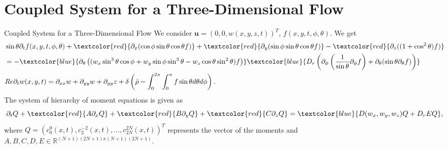 \section{Coupled System for a Three-Dimensional Flow}
\begin{frame}{Coupled System for a Three-Dimensional Flow}
	\scriptsize
	We consider $\boldsymbol{u} = \left( 0, 0, w(x,y,z,t)\right)^T$, $f(x,y,t,\phi,\theta)$. We get
	\begin{equation}
		\begin{aligned}
			&\sin\theta \partial_{t}f(x,y,t,\phi, \theta)+ \textcolor{red}{\partial_x(\cos\phi \sin\theta \cos\theta f)} + \textcolor{red}{\partial_y(\sin \phi \sin \theta \cos \theta f)} - \textcolor{red}{\partial_z((1+ \cos^2 \theta)f)} \\
			&= -  \textcolor{blue}{\partial_\theta\left(( w_x \sin^3 \theta \cos \phi + w_y\sin \phi \sin^3 \theta - w_z \cos \theta \sin^2 \theta) f\right)} \textcolor{blue}{D_{r}\left( \partial_\phi \left(\frac{1}{\sin \theta} \partial_\phi f \right)+ \partial_\theta (\sin \theta \partial_\theta f)\right)} \\
			&Re\partial_{t}w(x,y,t) = \partial_{xx}w + \partial_{yy}w + \partial_{yy}z + \delta\left(\bar{\rho}-\int_{0}^{2\pi} \int_{0}^{\pi} f \sin \theta d\theta d\phi \right).
		\end{aligned}
	\end{equation}
	\pause
	The system of hierarchy of moment equations is given as
	\begin{equation}
		\partial_t Q + \textcolor{red}{A  \partial_x Q}
		+ \textcolor{red}{B \partial_y Q} +  \textcolor{red}{C \partial_z Q} =  \textcolor{blue}{ D(w_x,w_y, w_z)Q+ D_rEQ},
	\end{equation}
	where $Q=(c^0_0(x,t), c^{-2}_2(x,t), \ldots, c^{2N}_{2N}(x,t))^T$ represents the vector of the moments and \\
	\vspace{2mm}
	$A,B,C,D,E \in \mathbb{R}^{(N+1)(2N+1)x(N+1)(2N+1)}$.
\end{frame}








